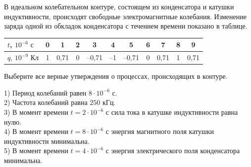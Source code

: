 \begin{taskbasic}[code={\label{task:elem_osc_v8_n14}}]
В идеальном колебательном контуре, состоящем из конденсатора и катушки индуктивности, происходят свободные электромагнитные колебания. Изменение заряда одной из обкладок конденсатора с течением времени показано в таблице.

\nopagebreak\smallskip
\begin{center}
\small
\begin{tabular}{|l|c|c|c|c|c|c|c|c|c|c|}
\hline
$t$, $10^{-6}\text{ с}$ & 0 & 1 & 2 & 3 & 4 & 5 & 6 & 7 & 8 & 9 \\ \hline
$q$, $10^{-9}\text{ Кл}$ & 1 & 0,71 & 0 & --0,71 & --1 & --0,71 & 0 & 0,71 & 1 & 0,71 \\ \hline
\end{tabular}
\end{center}
\smallskip

Выберите все верные утверждения о процессах, происходящих в контуре.

1) Период колебаний равен $8\cdot 10^{-6}\text{ с}$.\\
2) Частота колебаний равна $250\text{ кГц}$.\\
3) В момент времени $t = 2\cdot 10^{-6}\text{ с}$ сила тока в катушке индуктивности равна нулю.\\
4) В момент времени $t = 8\cdot 10^{-6}\text{ с}$ энергия магнитного поля катушки индуктивности минимальна.\\
5) В момент времени $t = 4\cdot 10^{-6}\text{ с}$ энергия электрического поля конденсатора минимальна.

\end{taskbasic}

